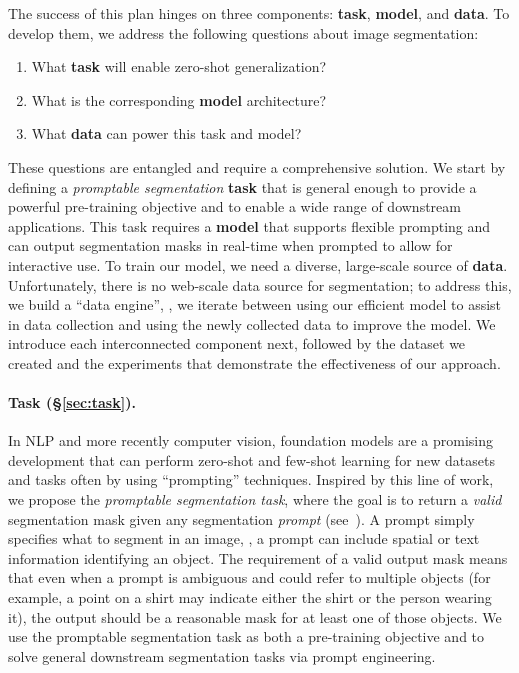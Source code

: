 The success of this plan hinges on three components: \textbf{task}, \textbf{model}, and \textbf{data}. To develop them, we address the following questions about image segmentation:
\begin{enumerate}[itemsep=-0.6mm]
\item What \textbf{task} will enable zero-shot generalization?
\item What is the corresponding \textbf{model} architecture?
\item What \textbf{data} can power this task and model?
\end{enumerate}
These questions are entangled and require a comprehensive solution. We start by defining a \emph{promptable segmentation} \textbf{task} that is general enough to provide a powerful pre-training objective and to enable a wide range of downstream applications. This task requires a \textbf{model} that supports flexible prompting and can output segmentation masks in real-time when prompted to allow for interactive use. To train our model, we need a diverse, large-scale source of \textbf{data}. Unfortunately, there is no web-scale data source for segmentation; to address this, we build a ``data engine'', \ie, we iterate between using our efficient model to assist in data collection and using the newly collected data to improve the model. We introduce each interconnected component next, followed by the dataset we created and the experiments that demonstrate the effectiveness of our approach.

\paragraph{Task (\S\ref{sec:task}).} In NLP and more recently computer vision, foundation models are a promising development that can perform zero-shot and few-shot learning for new datasets and tasks often by using ``prompting'' techniques. Inspired by this line of work, we propose the \emph{promptable segmentation task}, where the goal is to return a \emph{valid} segmentation mask given any segmentation \emph{prompt} (see~). A prompt simply specifies what to segment in an image, \eg, a prompt can include spatial or text information identifying an object. The requirement of a valid output mask means that even when a prompt is ambiguous and could refer to multiple objects (for example, a point on a shirt may indicate either the shirt or the person wearing it), the output should be a reasonable mask for at least one of those objects. We use the promptable segmentation task as both a pre-training objective and to solve general downstream segmentation tasks via prompt engineering.


